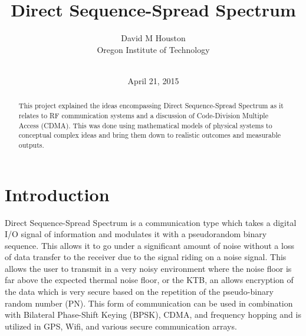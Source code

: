 \documentclass[journal]{IEEEtran}
\begin{document}
\title{Direct Sequence-Spread Spectrum}
\author{David M Houston\\
		Oregon Institute of Technology\\\\
		}
\date{April 21, 2015}

\maketitle

\begin{abstract}
This project explained the ideas encompassing Direct Sequence-Spread Spectrum as it relates to RF communication systems and a discussion of Code-Division Multiple Access (CDMA). This was done using mathematical models of physical systems to conceptual complex ideas and bring them down to realistic outcomes and measurable outputs.
\end{abstract}

\section{Introduction}
Direct Sequence-Spread Spectrum is a communication type which takes a digital I/O signal of information and modulates it with a pseudorandom binary sequence. This allows it to go under a significant amount of noise without a loss of data transfer to the receiver due to the signal riding on a noise signal. This allows the user to transmit in a very noisy environment where the noise floor is far above the expected thermal noise floor, or the KTB, an allows encryption of the data which is very secure based on the repetition of the pseudo-binary random number (PN). This form of communication can be used in combination with Bilateral Phase-Shift Keying (BPSK), CDMA, and frequency hopping and is utilized in GPS, Wifi, and various secure communication arrays. 
\end{document}
